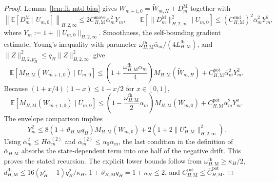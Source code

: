 \documentclass{article}
\begin{document}
\begin{proof}
Lemma~\ref{lem:fh-mtd-bias} gives $W_{m+1,0}=\widetilde W_{m,H}+D_m^{\mathrm M}$ together with
\begin{equation}
\left\lVert\mathbb E[D_m^{\mathrm M}\mid U_{m,0}]\right\rVert_{H,2,\infty}\le2C_{H,\mathrm M}^{\mathrm{move}}\bar\alpha_m^2Y_m,\qquad
\mathbb E\left[\lVert D_m^{\mathrm M}\rVert_{H,2,\infty}^2\mid U_{m,0}\right]\le(C_{H,\mathrm M}^{\mathrm{end}})^2\bar\alpha_m^2Y_m^2,
\end{equation}
where $Y_m:=1+\lVert U_{m,0}\rVert_{H,2,\infty}$. Smoothness, the self-bounding gradient estimate, Young's inequality with parameter $\omega_{H,\mathrm M}^{\mathrm{fh}}\bar\alpha_m/(4L_{H,\mathrm M}^{\mathrm{fh}})$, and $\lVert Z\rVert_{H,2,p_H^\star}^2\le q_H\lVert Z\rVert_{H,2,\infty}^2$ give
\begin{equation}
\mathbb E\left[M_{H,\mathrm M}(W_{m+1,0})\mid U_{m,0}\right]\le\left(1+\frac{\omega_{H,\mathrm M}^{\mathrm{fh}}\bar\alpha_m}{4}\right)M_{H,\mathrm M}(\widetilde W_{m,H})+C_{H,\mathrm M}^{\mathrm{pot}}\bar\alpha_m^2Y_m^2.
\end{equation}
Because $(1+x/4)(1-x)\le1-x/2$ for $x\in[0,1]$,
\begin{equation}
\mathbb E\left[M_{H,\mathrm M}(W_{m+1,0})\mid U_{m,0}\right]\le\left(1-\frac{\omega_{H,\mathrm M}^{\mathrm{fh}}}{2}\bar\alpha_m\right)M_{H,\mathrm M}(W_{m,0})+C_{H,\mathrm M}^{\mathrm{pot}}\bar\alpha_m^2Y_m^2.
\end{equation}
The envelope comparison implies
\begin{equation}
Y_m^2\le8(1+\vartheta_{H,\mathrm M}q_H)M_{H,\mathrm M}(W_{m,0})+2\left(1+2\lVert U_{H,\mathrm M}^\star\rVert_{H,2,\infty}^2\right).
\end{equation}
Using $\bar\alpha_m^2\le H\bar\alpha_m^{(2)}$ and $\bar\alpha_m^{(2)}\le\alpha_0\bar\alpha_m$, the last condition in the definition of $\bar\alpha_{H,\mathrm M}$ absorbs the state-dependent term into one half of the negative drift. This proves the stated recursion. The explicit lower bounds follow from $\omega_{H,\mathrm M}^{\mathrm{fh}}\ge\kappa_H/2$, $d_{H,\mathrm M}^{\mathrm{fh}}\le16(p_H^\star-1)q_H^2/\kappa_H$, $1+\vartheta_{H,\mathrm M}q_H=1+\kappa_H\le2$, and $C_{H,\mathrm M}^{\mathrm{pot}}\le\overline C_{H,\mathrm M}^{\mathrm{pot}}$.
\end{proof}
\end{document}
